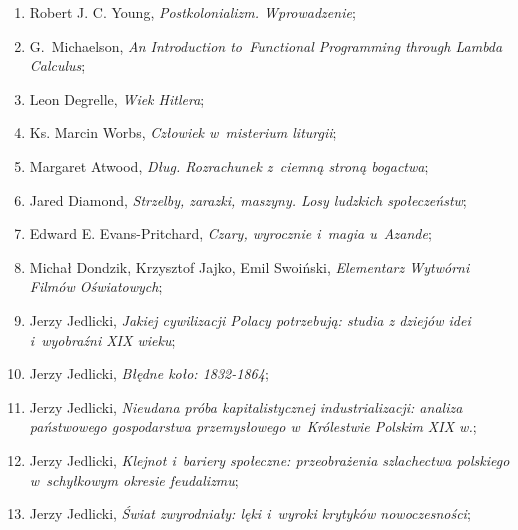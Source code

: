 \documentclass[a4paper,11pt]{article}
\begin{document}
\begin{enumerate}
\item Robert J. C. Young, \textit{Postkolonializm. Wprowadzenie};



\item G.~Michaelson, \textit{An Introduction to~Functional Programming
    through Lambda Calculus};



\item Leon Degrelle, \textit{Wiek Hitlera};



\item Ks. Marcin Worbs, \textit{Człowiek w~misterium liturgii};



\item Margaret Atwood, \textit{Dług. Rozrachunek z~ciemną stroną
    bogactwa};



\item Jared Diamond, \textit{Strzelby, zarazki, maszyny. Losy ludzkich
    społeczeństw};



\item Edward E. Evans-Pritchard, \textit{Czary, wyrocznie i~magia
    u~Azande};



\item Michał Dondzik, Krzysztof Jajko, Emil Swoiński, \textit{Elementarz
    Wytwórni Filmów Oświatowych};



\item Jerzy Jedlicki, \textit{Jakiej cywilizacji Polacy potrzebują:
    studia z dziejów idei i~wyobraźni XIX wieku};



\item Jerzy Jedlicki, \textit{Błędne koło: 1832-1864};



\item Jerzy Jedlicki, \textit{Nieudana próba kapitalistycznej
    industrializacji: analiza państwowego gospodarstwa przemysłowego
    w~Królestwie Polskim XIX w.};



\item Jerzy Jedlicki, \textit{Klejnot i~bariery społeczne: przeobrażenia
    szlachectwa polskiego w~schyłkowym okresie feudalizmu};



\item Jerzy Jedlicki, \textit{Świat zwyrodniały: lęki i~wyroki krytyków
    nowoczesności};




\end{enumerate}
\end{document}

